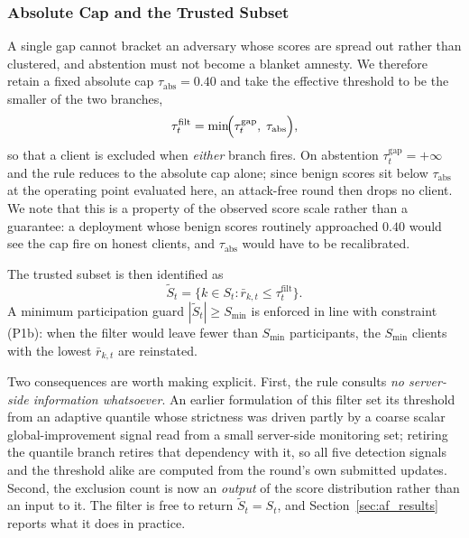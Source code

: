 \documentclass[journal]{IEEEtran}
\begin{document}
\subsubsection{Absolute Cap and the Trusted Subset}
A single gap cannot bracket an adversary whose scores are spread out rather than clustered, and abstention must not become a blanket amnesty. We therefore retain a fixed absolute cap $\tau_{\mathrm{abs}} = 0.40$ and take the effective threshold to be the smaller of the two branches,
\begin{equation}
\tau_t^{\mathrm{filt}} = \min\!\Bigl(\tau_t^{\mathrm{gap}},\; \tau_{\mathrm{abs}}\Bigr),
\label{eq:dual_thresh}
\end{equation}
so that a client is excluded when \emph{either} branch fires. On abstention $\tau_t^{\mathrm{gap}} = +\infty$ and the rule reduces to the absolute cap alone; since benign scores sit below $\tau_{\mathrm{abs}}$ at the operating point evaluated here, an attack-free round then drops no client. We note that this is a property of the observed score scale rather than a guarantee: a deployment whose benign scores routinely approached $0.40$ would see the cap fire on honest clients, and $\tau_{\mathrm{abs}}$ would have to be recalibrated.

The trusted subset is then identified as
\begin{equation}
\widetilde{S}_t = \bigl\{k \in S_t : \bar r_{k,t} \le \tau_t^{\mathrm{filt}}\bigr\}.
\label{eq:filtered_set}
\end{equation}
A minimum participation guard $|\widetilde{S}_t| \ge S_{\min}$ is enforced in line with constraint (P1b): when the filter would leave fewer than $S_{\min}$ participants, the $S_{\min}$ clients with the lowest $\bar r_{k,t}$ are reinstated.

Two consequences are worth making explicit. First, the rule consults \emph{no server-side information whatsoever}. An earlier formulation of this filter set its threshold from an adaptive quantile whose strictness was driven partly by a coarse scalar global-improvement signal read from a small server-side monitoring set; retiring the quantile branch retires that dependency with it, so all five detection signals and the threshold alike are computed from the round's own submitted updates. Second, the exclusion count is now an \emph{output} of the score distribution rather than an input to it. The filter is free to return $\widetilde{S}_t = S_t$, and Section~\ref{sec:af_results} reports what it does in practice.
\end{document}
